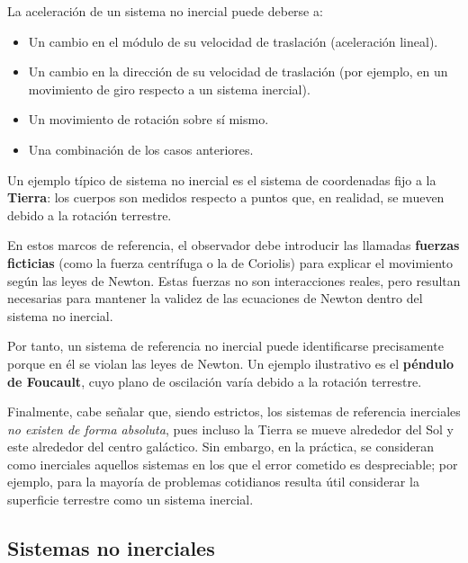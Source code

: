 \documentclass[a4paper,12pt]{article}
\begin{document}
La aceleración de un sistema no inercial puede deberse a:
\begin{itemize}
    \item Un cambio en el módulo de su velocidad de traslación (aceleración lineal).
    \item Un cambio en la dirección de su velocidad de traslación (por ejemplo, en un movimiento de giro respecto a un sistema inercial).
    \item Un movimiento de rotación sobre sí mismo.
    \item Una combinación de los casos anteriores.
\end{itemize}

Un ejemplo típico de sistema no inercial es el sistema de coordenadas fijo a la \textbf{Tierra}: los cuerpos son medidos respecto a puntos que, en realidad, se mueven debido a la rotación terrestre.  

En estos marcos de referencia, el observador debe introducir las llamadas \textbf{fuerzas ficticias} (como la fuerza centrífuga o la de Coriolis) para explicar el movimiento según las leyes de Newton. Estas fuerzas no son interacciones reales, pero resultan necesarias para mantener la validez de las ecuaciones de Newton dentro del sistema no inercial.

Por tanto, un sistema de referencia no inercial puede identificarse precisamente porque en él se violan las leyes de Newton. Un ejemplo ilustrativo es el \textbf{péndulo de Foucault}, cuyo plano de oscilación varía debido a la rotación terrestre.

Finalmente, cabe señalar que, siendo estrictos, los sistemas de referencia inerciales \emph{no existen de forma absoluta}, pues incluso la Tierra se mueve alrededor del Sol y este alrededor del centro galáctico. Sin embargo, en la práctica, se consideran como inerciales aquellos sistemas en los que el error cometido es despreciable; por ejemplo, para la mayoría de problemas cotidianos resulta útil considerar la superficie terrestre como un sistema inercial.

\newpage

\subsection{Sistemas no inerciales}
\end{document}
